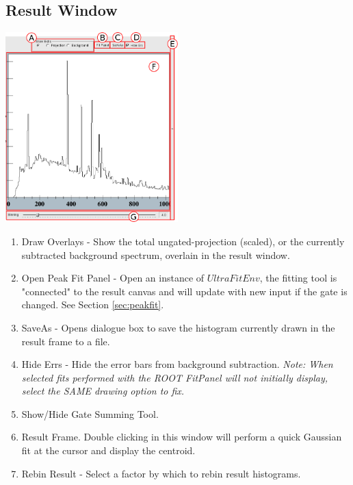 \documentclass[a4paper,10pt]{article}
\begin{document}
\subsection{Result Window}
\begin{center}
\includegraphics[width=0.5\textwidth]{toolD.png}
\end{center}
\begin{enumerate}
\item Draw Overlays - Show the total ungated-projection (scaled), or the currently subtracted background spectrum, overlain in the result window.
\item Open Peak Fit Panel - Open an instance of $UltraFitEnv$, the fitting tool is "connected" to the result canvas and will update with new input if the gate is changed. See Section \ref{sec:peakfit}.
\item SaveAs - Opens dialogue box to save the histogram currently drawn in the result frame to a file.
\item Hide Errs - Hide the error bars from background subtraction. \textit{Note: When selected fits performed with the ROOT FitPanel will not initially display, select the SAME drawing option to fix.}
\item Show/Hide Gate Summing Tool.
\item Result Frame. Double clicking in this window will perform a quick Gaussian fit at the cursor and display the centroid.
\item Rebin Result - Select a factor by which to rebin result histograms.
\end{enumerate}

\newpage
\end{document}
